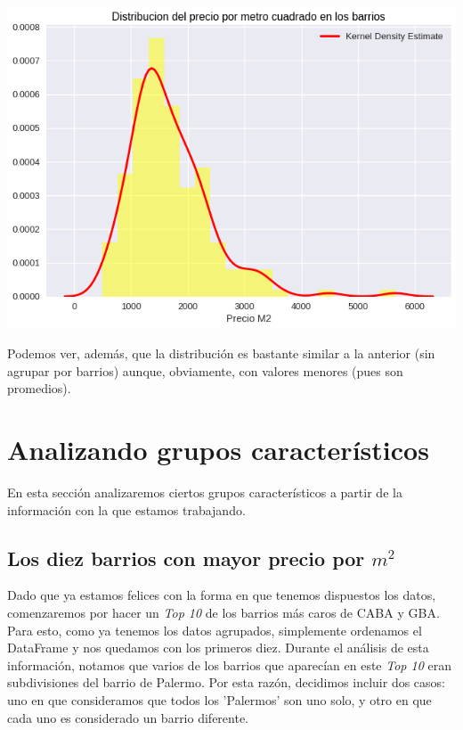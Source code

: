 \documentclass[a4paper, 10pt]{article}
\newcommand\tab[1][0.5cm]{\hspace*{#1}}
\begin{document}
				\begin{center}
   	    				\includegraphics[width=\textwidth]{images/m2HoodHistogram}
			    \end{center}	
			    \tab Podemos ver, además, que la distribución es bastante similar a la anterior (sin agrupar por barrios) aunque,
			    obviamente, con valores menores (pues son promedios).
		\section{Analizando grupos característicos}
			En esta sección analizaremos ciertos grupos característicos a partir de la información con la que estamos trabajando.
			\subsection{Los diez barrios con mayor precio por $m^2$}
				Dado que ya estamos felices con la forma en que tenemos dispuestos los datos, comenzaremos por hacer un
				\emph{Top 10} de los barrios más caros de CABA y GBA. \\
				\tab Para esto, como ya tenemos los datos agrupados, simplemente ordenamos el DataFrame y nos quedamos con
				los primeros diez.
				\tab Durante el análisis de esta información, notamos que varios de los barrios que aparecían en este \emph{Top 10}
				eran subdivisiones del barrio de Palermo. Por esta razón, decidimos incluir dos casos: uno en que consideramos
				que todos los 'Palermos' son uno solo, y otro en que cada uno es considerado un barrio diferente.
\end{document}

